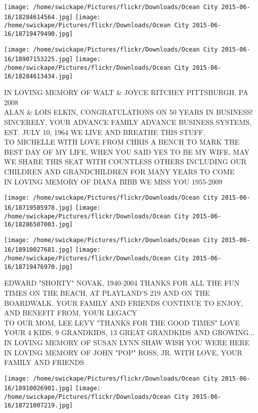 \documentclass[10pt,letterpaper]{article}
\begin{document}
\texttt{[image: /home/swickape/Pictures/flickr/Downloads/Ocean City 2015-06-16/18284614564.jpg]}
\texttt{[image: /home/swickape/Pictures/flickr/Downloads/Ocean City 2015-06-16/18719479490.jpg]}

\texttt{[image: /home/swickape/Pictures/flickr/Downloads/Ocean City 2015-06-16/18907153225.jpg]}
\texttt{[image: /home/swickape/Pictures/flickr/Downloads/Ocean City 2015-06-16/18284613434.jpg]}

IN LOVING MEMORY OF WALT \& JOYCE RITCHEY PITTSBURGH, PA 2008\\
ALAN \& LOIS ELKIN, CONGRATULATIONS ON 50 YEARS IN BUSINESS!  SINCERELY, YOUR ADVANCE FAMILY ADVANCE BUSINESS SYSTEMS, EST. JULY 10, 1964 WE LIVE AND BREATHE THIS STUFF.\\
TO MICHELLE WITH LOVE FROM CHRIS A BENCH TO MARK THE BEST DAY OF MY LIFE, WHEN YOU SAID YES TO BE MY WIFE, MAY WE SHARE THIS SEAT WITH COUNTLESS OTHERS INCLUDING OUR CHILDREN AND GRANDCHILDREN FOR MANY YEARS TO COME\\
IN LOVING MEMORY OF DIANA BIBB WE MISS YOU 1955{-}2009\\
\pagebreak

\texttt{[image: /home/swickape/Pictures/flickr/Downloads/Ocean City 2015-06-16/18719505978.jpg]}
\texttt{[image: /home/swickape/Pictures/flickr/Downloads/Ocean City 2015-06-16/18286507003.jpg]}

\texttt{[image: /home/swickape/Pictures/flickr/Downloads/Ocean City 2015-06-16/18910027681.jpg]}
\texttt{[image: /home/swickape/Pictures/flickr/Downloads/Ocean City 2015-06-16/18719476970.jpg]}

EDWARD "SHORTY" NOVAK, 1940{-}2004 THANKS FOR ALL THE FUN TIMES ON THE BEACH, AT PLAYLAND'S 219 AND ON THE BOARDWALK.  YOUR FAMILY AND FRIENDS CONTINUE TO ENJOY, AND BENEFIT FROM, YOUR LEGACY\\
TO OUR MOM, LEE LEVY "THANKS FOR THE GOOD TIMES" LOVE YOUR 4 KIDS, 9 GRANDKIDS, 13 GREAT GRANDKIDS AND GROWING...\\
IN LOVING MEMORY OF SUSAN LYNN SHAW WISH YOU WERE HERE\\
IN LOVING MEMORY OF JOHN "POP" ROSS, JR. WITH LOVE, YOUR FAMILY AND FRIENDS\\
\pagebreak

\texttt{[image: /home/swickape/Pictures/flickr/Downloads/Ocean City 2015-06-16/18910026901.jpg]}
\texttt{[image: /home/swickape/Pictures/flickr/Downloads/Ocean City 2015-06-16/18721007219.jpg]}
\end{document}
